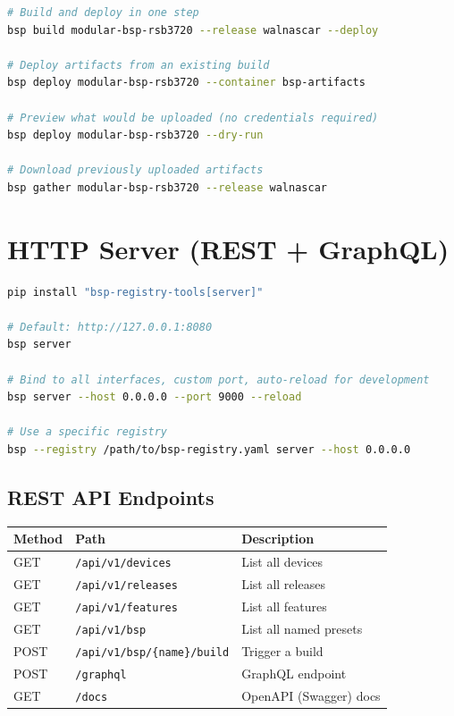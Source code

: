 \documentclass[a4paper,11pt]{article}
\begin{document}
\begin{lstlisting}[language=Bash]
# Build and deploy in one step
bsp build modular-bsp-rsb3720 --release walnascar --deploy

# Deploy artifacts from an existing build
bsp deploy modular-bsp-rsb3720 --container bsp-artifacts

# Preview what would be uploaded (no credentials required)
bsp deploy modular-bsp-rsb3720 --dry-run

# Download previously uploaded artifacts
bsp gather modular-bsp-rsb3720 --release walnascar
\end{lstlisting}

\section{HTTP Server (REST + GraphQL)}

\begin{lstlisting}[language=Bash]
pip install "bsp-registry-tools[server]"

# Default: http://127.0.0.1:8080
bsp server

# Bind to all interfaces, custom port, auto-reload for development
bsp server --host 0.0.0.0 --port 9000 --reload

# Use a specific registry
bsp --registry /path/to/bsp-registry.yaml server --host 0.0.0.0
\end{lstlisting}

\subsection{REST API Endpoints}

\begin{tabularx}{\linewidth}{L{14mm}L{72mm}X}
  \textbf{Method} & \textbf{Path} & \textbf{Description} \\
  \toprule
   GET  & \texttt{/api/v1/devices}              & List all devices \\
    GET  & \texttt{/api/v1/releases}             & List all releases \\
   GET  & \texttt{/api/v1/features}             & List all features \\
    GET  & \texttt{/api/v1/bsp}                  & List all named presets \\
   POST & \texttt{/api/v1/bsp/\{name\}/build}   & Trigger a build \\
    POST & \texttt{/graphql}                     & GraphQL endpoint \\
   GET  & \texttt{/docs}                        & OpenAPI (Swagger) docs \\
  \bottomrule
\end{tabularx}
\end{document}
